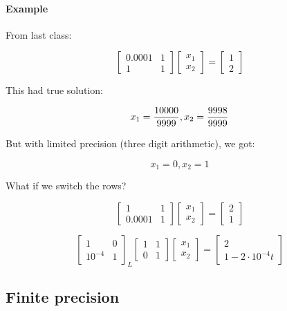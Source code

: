 \documentclass[12pt]{article}
\newcommand{\<}{\langle}
\renewcommand{\>}{\rangle}
\begin{document}
\paragraph{Example} From last class:

\[
	\begin{bmatrix}
		0.0001 & 1 \\ 1 & 1
	\end{bmatrix}
	\begin{bmatrix}
		x_1 \\ x_2
	\end{bmatrix} = 
	\begin{bmatrix}
		1 \\ 2
	\end{bmatrix}
\]

This had true solution:

\[
		x_1 = {10000 \over 9999}, x_2 = {9998 \over 9999}
\]

But with limited precision (three digit arithmetic), we got:

\[
		x_1 = 0, x_2 = 1
\]

What if we switch the rows?

\[
	\begin{bmatrix}
		1 & 1 \\ 0.0001 & 1
	\end{bmatrix}
	\begin{bmatrix}
		x_1 \\ x_2
	\end{bmatrix} = 
	\begin{bmatrix}
		2 \\ 1
	\end{bmatrix}
\]

\[
	\begin{bmatrix}
		1 & 0 \\ 10^{-4} & 1
	\end{bmatrix}_L
	\begin{bmatrix}
		1 & 1 \\ 0 & 1
	\end{bmatrix}
	\begin{bmatrix}
		x_1 \\ x_2
	\end{bmatrix} =
	\begin{bmatrix}
		2 \\ 1 - 2 \cdot 10^{-4}t
	\end{bmatrix}
\]

\subsection{Finite precision}
\end{document}
